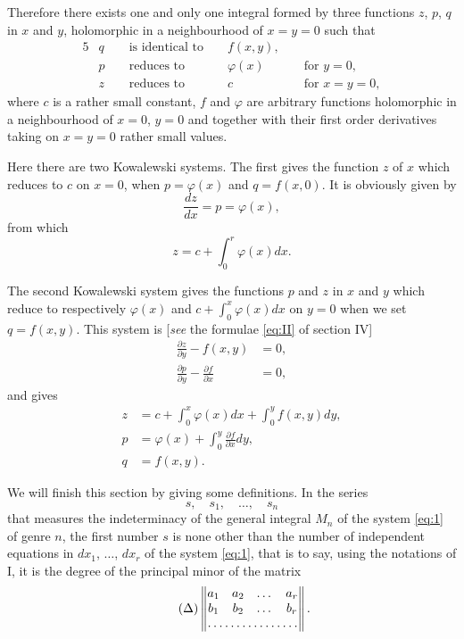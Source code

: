 \documentclass[leqno,11pt]{book}
\makeatletter
\newcommand{\pd}{\partial}
\theoremstyle{shape1}
\theoremstyle{shapesmall}
\let\old@phi\phi
\let\old@varphi\varphi
\let\phi\old@varphi
\let\varphi\old@phi
\makeatother
\begin{document}
Therefore there exists one and only one integral formed by three functions $z$, $p$, $q$ in $x$ and $y$, holomorphic in a neighbourhood of $x=y=0$ such that
\begin{alignat*}{5}
  &q&&\text{ is identical to }&&f(x,y),\\
  &p&&\text{ reduces to }&&\phi(x)&&\text{ for }y=0,\\
  &z&&\text{ reduces to }&&c&&\text{ for }x=y=0,
\end{alignat*}
where $c$ is a rather small constant, $f$ and $\phi$ are arbitrary functions holomorphic in a neighbourhood of $x=0$, $y=0$ and together with their first order derivatives taking on $x=y=0$ rather small values.

Here there are two Kowalewski systems. The first gives the function $z$ of $x$ which reduces to $c$ on $x=0$, when $p=\phi(x)$ and $q=f(x,0)$. It is obviously given by
\[
\frac{dz}{dx}=p=\phi(x),
\]
from which
\[
z=c+\int_{0}^{r}\phi(x)dx.
\]

The second Kowalewski system gives the functions $p$ and $z$ in $x$ and $y$ which reduce to respectively $\phi(x)$ and $c+\int_{0}^{x}\phi(x)dx$ on $y=0$ when we set $q=f(x,y)$. This system is [\emph{see} the formulae \eqref{eq:II} of section IV]
\begin{align*}
  \frac{\pd z}{\pd y}-f(x,y)&=0,\\
  \frac{\pd p}{\pd y}-\frac{\pd f}{\pd x}&=0,
\end{align*}
and gives
\begin{align*}
  z&=c+\int_{0}^{x}\phi(x)dx+\int_{0}^{y}f(x,y)dy,\\
  p&=\phi(x)+\int_{0}^{y}\frac{\pd f}{\pd x}dy,\\
  q&=f(x,y).
\end{align*}

We will finish this section by giving some definitions. In the series
\[
s,\quad s_{1},\quad \dots,\quad s_{n}
\]
that measures the indeterminacy of the general integral $M_{n}$ of the system \eqref{eq:1} of genre $n$, the first number $s$ is none other than the number of independent equations in $dx_{1}$, $\dots$, $dx_{r}$ of the system \eqref{eq:1}, that is to say, using the notations of \textsection I, it is the degree of the principal minor of the matrix
\begin{equation}
  \label{eq:Delta}\tag{$\Delta$}
  \begin{Vmatrix}
    a_{1}&a_{2}&\dots&a_{r}\\
    b_{1}&b_{2}&\dots&b_{r}\\
    \hdotsfor{4}
  \end{Vmatrix}.
\end{equation}
\end{document}
